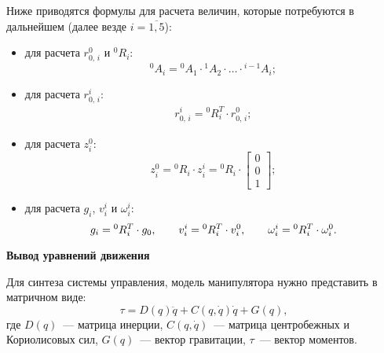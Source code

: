 Ниже приводятся формулы для расчета величин, которые потребуются в дальнейшем (далее везде $i = \overline{1,5}$):
\begin{itemize}
    \item для расчета $r^0_{0,\,i}$ и ${}^{0}R_i$:
        \begin{equation}
            {}^0A_i = {}^0A_1 \cdot {}^1A_2 \cdot \ldots \cdot {}^{i-1}A_i;
        \end{equation}
    \item для расчета $r^i_{0,\,i}$:
        \begin{gather}
            r^i_{0,\,i} = {}^{0}R_i^T \cdot r^0_{0,\,i};
        \end{gather}
    \item для расчета $z^0_i$:
        \begin{equation}
            z^0_i = {}^{0}R_i \cdot z^i_i = {}^{0}R_i \cdot
            \begin{bmatrix}
                0 \\ 0 \\ 1
            \end{bmatrix}\!\!;
        \end{equation}
    \item для расчета $g_i$, $v^i_i$ и $\omega^i_i$:
        \begin{equation}\label{eq_transform_of_g_v_omega}
            g_i = {}^{0}R_i^T \cdot g_0,
            \qquad
            v^i_i = {}^{0}R_i^T \cdot v^0_i,
            \qquad
            \omega^i_i = {}^{0}R_i^T \cdot \omega^0_i \ldotp
        \end{equation}
\end{itemize}

\textbf{Вывод уравнений движения}

Для синтеза системы управления, модель манипулятора нужно представить в матричном виде:
\begin{equation}\label{simple_dynamics}
	\tau = D(q) \ddot{q} + C(q,\dot{q}) \dot{q} + G(q),
\end{equation}
где $D(q)$~--- матрица инерции, $C(q,\dot{q})$~--- матрица центробежных и Кориолисовых сил, $G(q)$~--- вектор гравитации, $\tau$~--- вектор моментов.

